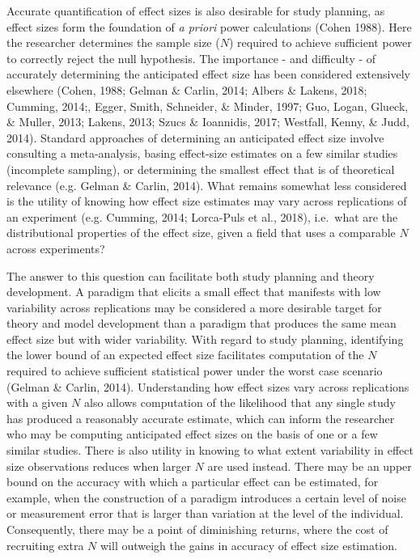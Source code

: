 \documentclass[
  man]{apa6}
\begin{document}
Accurate quantification of effect sizes is also desirable for study planning, as effect sizes form the foundation of \emph{a priori} power calculations (Cohen 1988). Here the researcher determines the sample size (\(N\)) required to achieve sufficient power to correctly reject the null hypothesis. The importance - and difficulty - of accurately determining the anticipated effect size has been considered extensively elsewhere (Cohen, 1988; Gelman \& Carlin, 2014; Albers \& Lakens, 2018; Cumming, 2014;, Egger, Smith, Schneider, \& Minder, 1997; Guo, Logan, Glueck, \& Muller, 2013; Lakens, 2013; Szucs \& Ioannidis, 2017; Westfall, Kenny, \& Judd, 2014). Standard approaches of determining an anticipated effect size involve consulting a meta-analysis, basing effect-size estimates on a few similar studies (incomplete sampling), or determining the smallest effect that is of theoretical relevance (e.g. Gelman \& Carlin, 2014). What remains somewhat less considered is the utility of knowing how effect size estimates may vary across replications of an experiment (e.g. Cumming, 2014; Lorca-Puls et al., 2018), i.e.~what are the distributional properties of the effect size, given a field that uses a comparable \(N\) across experiments?

The answer to this question can facilitate both study planning and theory development. A paradigm that elicits a small effect that manifests with low variability across replications may be considered a more desirable target for theory and model development than a paradigm that produces the same mean effect size but with wider variability. With regard to study planning, identifying the lower bound of an expected effect size facilitates computation of the \(N\) required to achieve sufficient statistical power under the worst case scenario (Gelman \& Carlin, 2014). Understanding how effect sizes vary across replications with a given \(N\) also allows computation of the likelihood that any single study has produced a reasonably accurate estimate, which can inform the researcher who may be computing anticipated effect sizes on the basis of one or a few similar studies. There is also utility in knowing to what extent variability in effect size observations reduces when larger \(N\) are used instead. There may be an upper bound on the accuracy with which a particular effect can be estimated, for example, when the construction of a paradigm introduces a certain level of noise or measurement error that is larger than variation at the level of the individual. Consequently, there may be a point of diminishing returns, where the cost of recruiting extra \(N\) will outweigh the gains in accuracy of effect size estimation.
\end{document}
